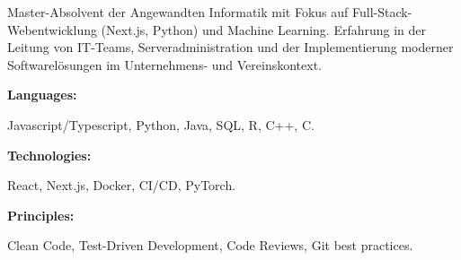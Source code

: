 \documentclass[9pt]{developercv} %
\begin{document}
\begin{minipage}[t]{0.46\textwidth}
	\vspace{-6pt}


	Master-Absolvent der Angewandten Informatik mit Fokus auf Full-Stack-Webentwicklung (Next.js, Python) und Machine Learning. Erfahrung in der Leitung von IT-Teams, Serveradministration und der Implementierung moderner Softwarelösungen im Unternehmens- und Vereinskontext.
\end{minipage}
\hfill %
\begin{minipage}[t]{0.465\textwidth}
	\vspace{-6pt}

	\begin{minipage}[t]{0.28\textwidth}
		\textbf{Languages:}
	\end{minipage}
	\hfill
	\begin{minipage}[t]{0.71\textwidth}
		Javascript/Typescript, Python, Java, SQL, R, C++, C.
	\end{minipage}
	\vspace{3mm}

	\begin{minipage}[t]{0.28\textwidth}
		\textbf{Technologies:}
	\end{minipage}
	\hfill
	\begin{minipage}[t]{0.71\textwidth}
		React, Next.js, Docker, CI/CD, PyTorch.
	\end{minipage}
	\vspace{-1mm}

	\begin{minipage}[t]{0.28\textwidth}
		\textbf{Principles:}
	\end{minipage}
	\hfill
	\begin{minipage}[t]{0.71\textwidth}
		Clean Code, Test-Driven Development, Code Reviews, Git best practices.
	\end{minipage}

\end{minipage}
\end{document}

